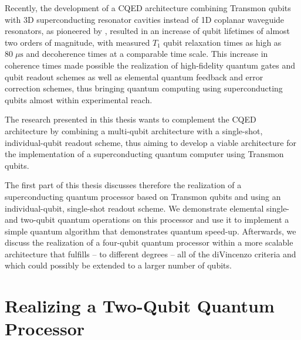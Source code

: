 Recently, the development of a CQED architecture combining Transmon qubits with 3D superconducting resonator cavities instead of 1D coplanar waveguide resonators, as pioneered by \cite{paik_observation_2011}, resulted in an increase of qubit lifetimes of almost two orders of magnitude, with measured $T_1$ qubit relaxation times as high as $80 \; \mu \mathrm{s}$ and decoherence times at a comparable time scale. This increase in coherence times made possible the realization of high-fidelity quantum gates and qubit readout schemes  as well as elemental quantum feedback and error correction schemes, thus bringing quantum computing using superconducting qubits almost within experimental reach.

The research presented in this thesis wants to complement the CQED architecture by combining a multi-qubit architecture with a single-shot, individual-qubit readout scheme, thus aiming to develop a viable architecture for the implementation of a superconducting quantum computer using Transmon qubits. 

The first part of this thesis discusses therefore the realization of a superconducting quantum processor based on Transmon qubits and using an individual-qubit, single-shot readout scheme. We demonstrate elemental single- and two-qubit quantum operations on this processor and use it to implement a simple quantum algorithm that demonstrates quantum speed-up. Afterwards, we discuss the realization of a four-qubit quantum processor within a more scalable architecture that fulfills -- to different degrees -- all of the diVincenzo criteria and which could possibly be extended to a larger number of qubits.

\section{Realizing a Two-Qubit Quantum Processor}

